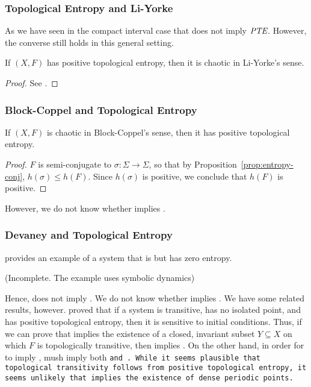 \documentclass[12pt,twoside,draft]{book}
\begin{document}
\subsubsection*{Topological Entropy and Li-Yorke}
As we have seen in the compact interval case that \liy does not imply $\emph{PTE}$.
However, the converse still holds in this general setting.
\begin{theorem}
  If $(X,F)$ has positive topological entropy, then it is chaotic in Li-Yorke's sense.
  \label{thm:entropy-liyorke}
  \begin{proof}
    See \citet{blanchard}.
  \end{proof}
\end{theorem}

\subsubsection*{Block-Coppel and Topological Entropy}
\begin{theorem}
  If $(X,F)$ is chaotic in Block-Coppel's sense, then it has positive topological entropy.
  \begin{proof}
    $F$ is semi-conjugate to $\sigma: \Sigma \to \Sigma$, so that by Proposition~\ref{prop:entropy-conj}, $h(\sigma) \leq h(F)$.
    Since $h(\sigma)$ is positive, we conclude that $h(F)$ is positive.
  \end{proof}
  \label{thm:blcp-entropy}
\end{theorem}
%
However, we do not know whether \pte implies \blcp.



\subsubsection*{Devaney and Topological Entropy}
\citet{glasner} provides an example of a system that is \dev but has zero entropy.
\begin{example}
  (Incomplete. The example uses symbolic dynamics)
  \label{eg:glasner}
\end{example}
Hence, \dev does not imply \pte.
We do not know whether \pte implies \dev.
We have some related results, however.
\citet{glasner} proved that if a system is transitive, has no isolated point, and has positive topological entropy, then it is sensitive to initial conditions.
Thus, if we can prove that \pte implies the existence of a closed, invariant subset $Y \subseteq X$ on which $F$ is topologically transitive, then \pte implies \wig.
On the other hand, in order for \pte to imply \dev, \pte mush imply both \tt and \dpp.
While it seems plausible that topological transitivity follows from positive topological entropy, it seems unlikely that \pte implies the existence of dense periodic points.
\end{document}
